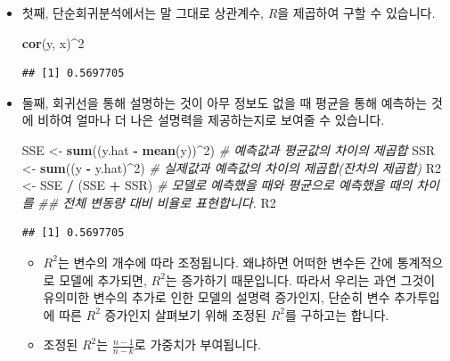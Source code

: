 \documentclass[]{book}
\newenvironment{Shaded}{\begin{snugshade}}{\end{snugshade}}
\newcommand{\CommentTok}[1]{\textcolor[rgb]{0.56,0.35,0.01}{\textit{#1}}}
\newcommand{\DecValTok}[1]{\textcolor[rgb]{0.00,0.00,0.81}{#1}}
\newcommand{\KeywordTok}[1]{\textcolor[rgb]{0.13,0.29,0.53}{\textbf{#1}}}
\newcommand{\NormalTok}[1]{#1}
\newcommand{\OperatorTok}[1]{\textcolor[rgb]{0.81,0.36,0.00}{\textbf{#1}}}
\newcommand{\StringTok}[1]{\textcolor[rgb]{0.31,0.60,0.02}{#1}}
\begin{document}
\begin{itemize}
\item
  첫째, 단순회귀분석에서는 말 그대로 상관계수, \(R\)을 제곱하여 구할 수 있습니다.

\begin{Shaded}
\begin{Highlighting}[]
\KeywordTok{cor}\NormalTok{(y, x)}\OperatorTok{^}\DecValTok{2}
\end{Highlighting}
\end{Shaded}

\begin{verbatim}
## [1] 0.5697705
\end{verbatim}
\item
  둘째, 회귀선을 통해 설명하는 것이 아무 정보도 없을 때 평균을 통해 예측하는 것에 비하여 얼마나 더 나은 설명력을 제공하는지로 보여줄 수 있습니다.

\begin{Shaded}
\begin{Highlighting}[]
\NormalTok{SSE <-}\StringTok{ }\KeywordTok{sum}\NormalTok{((y.hat }\OperatorTok{-}\StringTok{ }\KeywordTok{mean}\NormalTok{(y))}\OperatorTok{^}\DecValTok{2}\NormalTok{) }\CommentTok{# 예측값과 평균값의 차이의 제곱합}
\NormalTok{SSR <-}\StringTok{ }\KeywordTok{sum}\NormalTok{((y }\OperatorTok{-}\StringTok{ }\NormalTok{y.hat)}\OperatorTok{^}\DecValTok{2}\NormalTok{) }\CommentTok{# 실제값과 예측값의 차이의 제곱합(잔차의 제곱합)}
\NormalTok{R2 <-}\StringTok{ }\NormalTok{SSE }\OperatorTok{/}\StringTok{ }\NormalTok{(SSE }\OperatorTok{+}\StringTok{ }\NormalTok{SSR) }\CommentTok{# 모델로 예측했을 때와 평균으로 예측했을 때의 차이를}
                        \CommentTok{## 전체 변동량 대비 비율로 표현합니다.}
\NormalTok{R2}
\end{Highlighting}
\end{Shaded}

\begin{verbatim}
## [1] 0.5697705
\end{verbatim}

  \begin{itemize}
  \item
    \(R^2\)는 변수의 개수에 따라 조정됩니다. 왜냐하면 어떠한 변수든 간에 통계적으로 모델에 추가되면, \(R^2\)는 증가하기 때문입니다. 따라서 우리는 과연 그것이 유의미한 변수의 추가로 인한 모델의 설명력 증가인지, 단순히 변수 추가투입에 따른 \(R^2\) 증가인지 살펴보기 위해 조정된 \(R^2\)를 구하고는 합니다.
  \item
    조정된 \(R^2\)는 \(\frac{n-1}{n-k}\)로 가중치가 부여됩니다.


\end{itemize}
\end{itemize}
\end{document}

